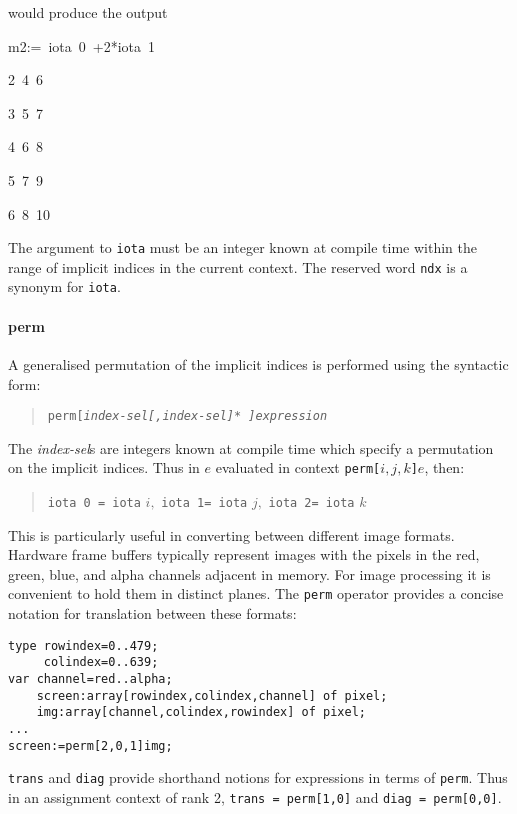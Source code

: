 {would produce the output

\begin{lyxcode}
m2:=~iota~0~+2{*}iota~1~

2~4~6~

3~5~7~

4~6~8~

5~7~9~

6~8~10~~
\end{lyxcode}
The argument to \texttt{iota} must be an integer known at compile
time within the range of implicit indices in the current context. The reserved
word \texttt{ndx} is a synonym for \texttt{iota}.


\paragraph{perm}

A generalised permutation of the implicit indices is performed using the syntactic
form: 

\begin{quote}
\texttt{perm}\texttt{{[}}\texttt{\textit{index-sel{[},index-sel{]}{*} {]}expression }}
\end{quote}
The \textit{index-sel}s are integers known at compile time which specify a permutation
on the implicit indices. Thus in $ e $ evaluated in context \texttt{perm}\texttt{{[}$ i,j,k ${]}$ e $},
then: 

\begin{quote}
\texttt{iota 0 = iota} \texttt{$ i, $} \texttt{iota 1= iota} \texttt{$ j, $}
\texttt{iota 2= iota} \texttt{$ k $}
\end{quote}
This is particularly useful in converting between different image formats. Hardware
frame buffers typically represent images with the pixels in the red, green,
blue, and alpha channels adjacent in memory. For image processing it is convenient
to hold them in distinct planes. The \texttt{perm} operator provides a concise
notation for translation between these formats: \begin{verbatim}
type rowindex=0..479;
     colindex=0..639;
var channel=red..alpha;
    screen:array[rowindex,colindex,channel] of pixel;
    img:array[channel,colindex,rowindex] of pixel;
...
screen:=perm[2,0,1]img;
\end{verbatim}

\texttt{trans} and \texttt{diag} \label{diag} provide shorthand
notions for expressions in terms of \texttt{perm}. Thus in an assignment
context of rank 2, \texttt{trans = perm{[}1,0{]}} and \texttt{diag = perm{[}0,0{]}}. 


}
